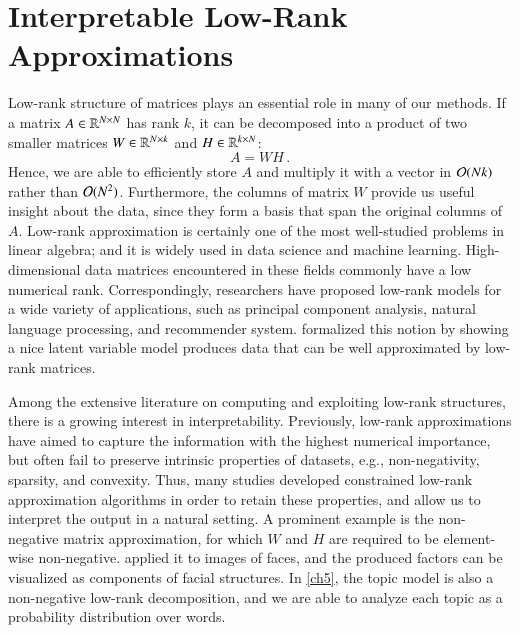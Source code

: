 \section{Interpretable Low\hyp{}Rank Approximations}\label{pre:lra}

Low\hyp{}rank structure of matrices plays an essential role in many of our
methods. If a matrix $A\in\mathbb{R}^{N\times N}$ has rank $k$, it can be
decomposed into a product of two smaller matrices $W\in\mathbb{R}^{N\times k}$ and
$H\in\mathbb{R}^{k\times N}$:
\begin{equation}\label{eqn:low_rank}
A = WH\,.
\end{equation}
Hence, we are able to efficiently store $A$ and multiply it with a vector in
$\mathcal{O}(Nk)$ rather than $\mathcal{O}(N^2)$. Furthermore, the columns of matrix $W$
provide us useful insight about the data, since they form a basis that span the
original columns of $A$. Low\hyp{}rank approximation is certainly one of the
most well\hyp{}studied problems in linear algebra; and it is widely used in data
science and machine learning. High\hyp{}dimensional data matrices encountered in
these fields commonly have a low numerical rank. Correspondingly, researchers
have proposed low\hyp{}rank models for a wide variety of applications, such as
principal component analysis, natural language processing, and recommender
system. \citet{udell2019big} formalized this notion by showing a nice latent
variable model produces data that can be well approximated by low\hyp{}rank
matrices.

Among the extensive literature on computing and exploiting low\hyp{}rank
structures, there is a growing interest in interpretability. Previously, 
low\hyp{}rank approximations have aimed to capture the information with the
highest numerical importance, but often fail to preserve intrinsic properties of
datasets, e.g., non\hyp{}negativity, sparsity, and convexity. Thus, many studies
developed constrained low\hyp{}rank approximation algorithms in order to retain
these properties, and allow us to interpret the output in a natural setting. A
prominent example is the non\hyp{}negative matrix approximation, for which $W$
and $H$ are required to be element\hyp{}wise non\hyp{}negative. 
\citet{lee1999learning} applied it to images of faces, and the produced factors
can be visualized as components of facial structures. In \cref{ch5}, the topic
model is also a non\hyp{}negative low\hyp{}rank decomposition, and we are able
to analyze each topic as a probability distribution over words.

